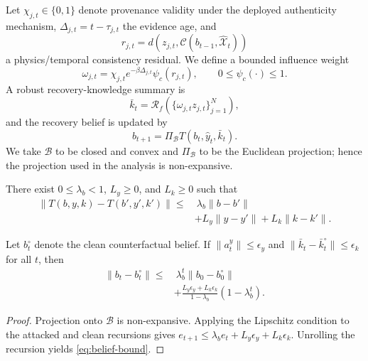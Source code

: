 Let $\chi_{j,t}\in\{0,1\}$ denote provenance validity under the deployed authenticity mechanism, $\Delta_{j,t}=t-\tau_{j,t}$ the evidence age, and
\begin{equation}
r_{j,t}=d\!\left(z_{j,t},\mathcal C(b_{t-1},\widehat{\mathcal X}_t)\right)
\end{equation}
a physics/temporal consistency residual. We define a bounded influence weight
\begin{equation}
\omega_{j,t}=\chi_{j,t}e^{-\beta\Delta_{j,t}}\psi_c(r_{j,t}),
\qquad 0\le\psi_c(\cdot)\le1.
\end{equation}
A robust recovery-knowledge summary is
\begin{equation}
\bar k_t=\mathcal R_f(\{\omega_{j,t}z_{j,t}\}_{j=1}^{N}),
\end{equation}
and the recovery belief is updated by
\begin{equation}
b_{t+1}=\Pi_{\mathcal B}T(b_t,\widehat y_t,\bar k_t).
\label{eq:belief}
\end{equation}
We take $\mathcal B$ to be closed and convex and $\Pi_{\mathcal B}$ to be the Euclidean projection; hence the projection used in the analysis is non-expansive.

\begin{assumption}
There exist $0\le\lambda_b<1$, $L_y\ge0$, and $L_k\ge0$ such that
\begin{align}
\|T(b,y,k)-T(b',y',k')\|
\le&\ \lambda_b\|b-b'\| \nonumber\\
&+L_y\|y-y'\|+L_k\|k-k'\|.
\end{align}
\end{assumption}

\begin{theorem}
Let $b_t^\circ$ denote the clean counterfactual belief. If
$\|a_t^y\|\le\epsilon_y$ and
$\|\bar k_t-\bar k_t^\circ\|\le\epsilon_k$ for all $t$, then
\begin{align}
\|b_t-b_t^\circ\|
\le&\ \lambda_b^t\|b_0-b_0^\circ\| \nonumber\\
&+\frac{L_y\epsilon_y+L_k\epsilon_k}{1-\lambda_b}
(1-\lambda_b^t).
\label{eq:belief-bound}
\end{align}
\end{theorem}
\begin{proof}
Projection onto $\mathcal B$ is non-expansive. Applying the Lipschitz condition to the attacked and clean recursions gives
$e_{t+1}\le\lambda_b e_t+L_y\epsilon_y+L_k\epsilon_k$.
Unrolling the recursion yields \eqref{eq:belief-bound}.
\end{proof}

